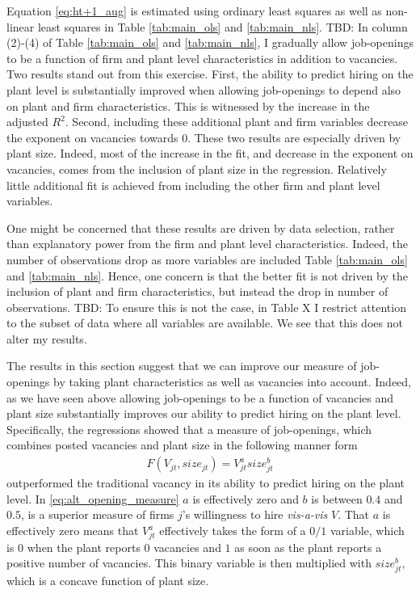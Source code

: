 Equation \eqref{eq:ht+1_aug} is estimated using ordinary least squares as well as non-linear least squares in Table  \ref{tab:main_ols} and \ref{tab:main_nls}. TBD: In column (2)-(4) of Table \ref{tab:main_ols} and \ref{tab:main_nls}, I gradually allow job-openings to be a function of firm and plant level characteristics in addition to vacancies. Two results stand out from this exercise. First, the ability to predict hiring on the plant level is substantially improved when allowing job-openings to depend also on plant and firm characteristics. This is witnessed by the increase in the adjusted $R^2$. Second, including these additional plant and firm variables decrease the exponent on vacancies towards $0$. These two results are especially driven by plant size. Indeed, most of the increase in the fit, and decrease in the exponent on vacancies, comes from the inclusion of plant size in the regression. Relatively little additional fit is achieved from including the other firm and plant level variables. 

One might be concerned that these results are driven by data selection, rather than explanatory power from the firm and plant level characteristics. Indeed, the number of observations drop as more variables are included Table \ref{tab:main_ols} and \ref{tab:main_nls}. Hence, one concern is that the better fit is not driven by the inclusion of  plant and firm characteristics, but instead the drop in number of observations. TBD: To ensure this is not the case, in Table X I restrict attention to the subset of data where all variables are available. We see that this does not alter my results. 

The results in this section suggest that we can improve our measure of job-openings by taking plant characteristics as well as vacancies into account. Indeed, as we have seen above allowing job-openings to be a function of vacancies and plant size substantially improves our ability to predict hiring on the plant level. Specifically, the regressions showed that a measure of job-openings, which combines posted vacancies and plant size in the following manner form
\begin{align}
F(V_{jt}, size_{jt})=V_{jt}^{a} size_{jt}^{b}
\label{eq:alt_opening_measure}
\end{align}
outperformed the traditional vacancy in its ability to predict hiring on the plant level. In \eqref{eq:alt_opening_measure}
$a$ is effectively zero and $b$ is between $0.4$ and $0.5$, is a superior measure of firms $j$'s willingness to hire \emph{vis-a-vis} $V$. That $a$ is effectively zero means that $V_{jt}^{a}$ effectively takes the form of a $0/1$ variable, which is $0$ when the plant reports $0$ vacancies and $1$ as soon as the plant reports a positive number of vacancies. This binary variable is then multiplied with $size_{jt}^{b}$, which is a concave function of plant size. 

